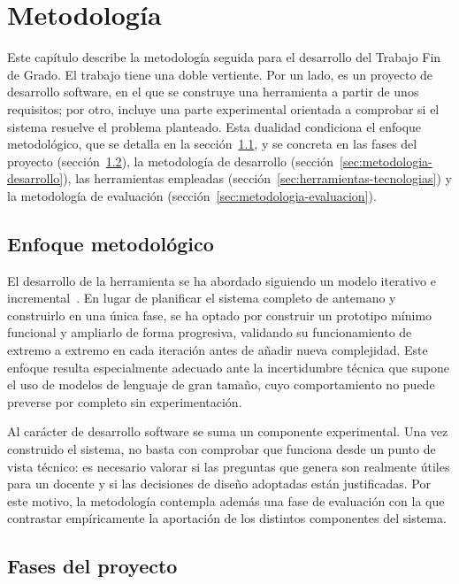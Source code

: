 \chapter{Metodología}
\label{cap:metodologia}

Este capítulo describe la metodología seguida para el desarrollo del
Trabajo Fin de Grado. El trabajo tiene una doble vertiente. Por un lado,
es un proyecto de desarrollo software, en el que se construye una
herramienta a partir de unos requisitos; por otro, incluye una parte
experimental orientada a comprobar si el sistema resuelve el problema
planteado. Esta
dualidad condiciona el enfoque metodológico, que se detalla
en la sección~\ref{sec:enfoque-metodologico}, y se concreta en las fases
del proyecto (sección~\ref{sec:fases-proyecto}), la metodología de
desarrollo (sección~\ref{sec:metodologia-desarrollo}), las herramientas
empleadas (sección~\ref{sec:herramientas-tecnologias}) y la metodología
de evaluación (sección~\ref{sec:metodologia-evaluacion}).


\section{Enfoque metodológico}
\label{sec:enfoque-metodologico}

El desarrollo de la herramienta se ha abordado siguiendo un modelo
iterativo e incremental~\parencite{larman2003iid}. En lugar de planificar el sistema completo de
antemano y construirlo en una única fase, se ha optado por construir un
prototipo mínimo funcional y ampliarlo de forma progresiva, validando su
funcionamiento de extremo a extremo en cada iteración antes de añadir
nueva complejidad. Este enfoque resulta especialmente adecuado ante la incertidumbre
técnica que supone el uso de modelos de lenguaje de gran tamaño, cuyo
comportamiento no puede preverse por completo sin experimentación.

Al carácter de desarrollo software se suma un componente experimental.
Una vez construido el sistema, no basta con comprobar que funciona desde
un punto de vista técnico: es necesario valorar si las preguntas que
genera son realmente útiles para un docente y si las decisiones de
diseño adoptadas están justificadas. Por este motivo, la metodología
contempla además una fase de evaluación con la que contrastar
empíricamente la aportación de los distintos componentes del sistema.


\section{Fases del proyecto}
\label{sec:fases-proyecto}


